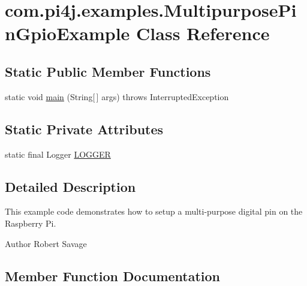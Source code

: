 \hypertarget{classcom_1_1pi4j_1_1examples_1_1MultipurposePinGpioExample}{}\section{com.\+pi4j.\+examples.\+Multipurpose\+Pin\+Gpio\+Example Class Reference}
\label{classcom_1_1pi4j_1_1examples_1_1MultipurposePinGpioExample}
\subsection*{Static Public Member Functions}
\begin{DoxyCompactItemize}
\item 
static void \hyperlink{classcom_1_1pi4j_1_1examples_1_1MultipurposePinGpioExample_a7e30237e1014da090db9da21801b2ee9}{main} (String\mbox{[}$\,$\mbox{]} args)  throws Interrupted\+Exception 
\end{DoxyCompactItemize}
\subsection*{Static Private Attributes}
\begin{DoxyCompactItemize}
\item 
static final Logger \hyperlink{classcom_1_1pi4j_1_1examples_1_1MultipurposePinGpioExample_a9a1347f7e0ff65f61938faa256526811}{L\+O\+G\+G\+E\+R}
\end{DoxyCompactItemize}


\subsection{Detailed Description}
This example code demonstrates how to setup a multi-\/purpose digital pin on the Raspberry Pi.

\begin{DoxyAuthor}{Author}
Robert Savage 
\end{DoxyAuthor}


\subsection{Member Function Documentation}
\hypertarget{classcom_1_1pi4j_1_1examples_1_1MultipurposePinGpioExample_a7e30237e1014da090db9da21801b2ee9}{}

